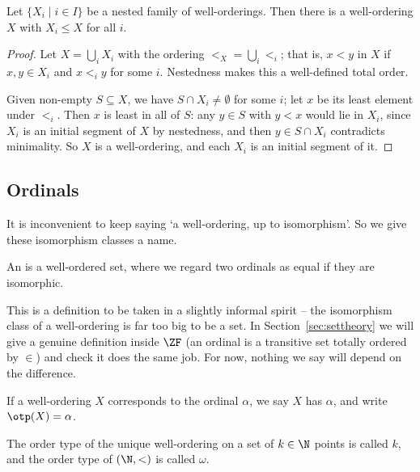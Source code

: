 \begin{proposition}\label{prop:nestedunion}
  Let $\{X_i \mid i \in I\}$ be a nested family of well-orderings. Then there is a well-ordering $X$ with $X_i \leq X$ for all $i$.
\end{proposition}
\begin{proof}
  Let $X = \bigcup_i X_i$ with the ordering $<_X = \bigcup_i <_i$; that is, $x < y$ in $X$ if $x, y \in X_i$ and $x <_i y$ for some $i$. Nestedness makes this a well-defined total order.

  Given non-empty $S \subseteq X$, we have $S \cap X_i \neq \emptyset$ for some $i$; let $x$ be its least element under $<_i$. Then $x$ is least in all of $S$: any $y \in S$ with $y < x$ would lie in $X_i$, since $X_i$ is an initial segment of $X$ by nestedness, and then $y \in S \cap X_i$ contradicts minimality. So $X$ is a well-ordering, and each $X_i$ is an initial segment of it.
\end{proof}

\subsection{Ordinals}

It is inconvenient to keep saying `a well-ordering, up to isomorphism'. So we give these isomorphism classes a name.

\begin{definition}[Ordinal]
  An  is a well-ordered set, where we regard two ordinals as equal if they are isomorphic.
\end{definition}

This is a definition to be taken in a slightly informal spirit -- the isomorphism class of a well-ordering is far too big to be a set. In Section~\ref{sec:settheory} we will give a genuine definition inside $\ZF$ (an ordinal is a transitive set totally ordered by $\in$) and check it does the same job. For now, nothing we say will depend on the difference.

\begin{definition}
  If a well-ordering $X$ corresponds to the ordinal $\alpha$, we say $X$ has  $\alpha$, and write $\otp(X) = \alpha$.
\end{definition}

The order type of the unique well-ordering on a set of $k \in \N$ points is called $k$, and the order type of $(\N, <)$ is called $\omega$.

